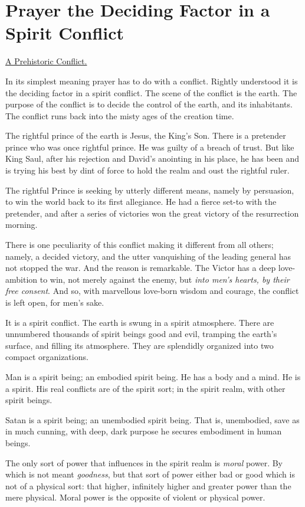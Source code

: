 \chapter{Prayer the Deciding Factor in a Spirit Conflict}



\underline{A Prehistoric Conflict.}


In its simplest meaning prayer has to do with a conflict. Rightly
understood it is the deciding factor in a spirit conflict. The scene of
the conflict is the earth. The purpose of the conflict is to decide the
control of the earth, and its inhabitants. The conflict runs back into the
misty ages of the creation time.

The rightful prince of the earth is Jesus, the King's Son. There is a
pretender prince who was once rightful prince. He was guilty of a breach
of trust. But like King Saul, after his rejection and David's anointing in
his place, he has been and is trying his best by dint of force to hold the
realm and oust the rightful ruler.

The rightful Prince is seeking by utterly different means, namely by
persuasion, to win the world back to its first allegiance. He had a fierce
set-to with the pretender, and after a series of victories won the great
victory of the resurrection morning.

There is one peculiarity of this conflict making it different from all
others; namely, a decided victory, and the utter vanquishing of the
leading general has not stopped the war. And the reason is remarkable. The
Victor has a deep love-ambition to win, not merely against the enemy, but
\textit{into men's hearts, by their free consent}. And so, with marvellous
love-born wisdom and courage, the conflict is left open, for men's sake.

It is a spirit conflict. The earth is swung in a spirit atmosphere. There
are unnumbered thousands of spirit beings good and evil, tramping the
earth's surface, and filling its atmosphere. They are splendidly organized
into two compact organizations.

Man is a spirit being; an embodied spirit being. He has a body and a mind.
He is a spirit. His real conflicts are of the spirit sort; in the spirit
realm, with other spirit beings.

Satan is a spirit being; an unembodied spirit being. That is, unembodied,
save as in much cunning, with deep, dark purpose he secures embodiment in
human beings.

The only sort of power that influences in the spirit realm is \textit{moral}
power. By which is not meant \textit{goodness}, but that sort of power either bad
or good which is not of a physical sort: that higher, infinitely higher
and greater power than the mere physical. Moral power is the opposite of
violent or physical power.

